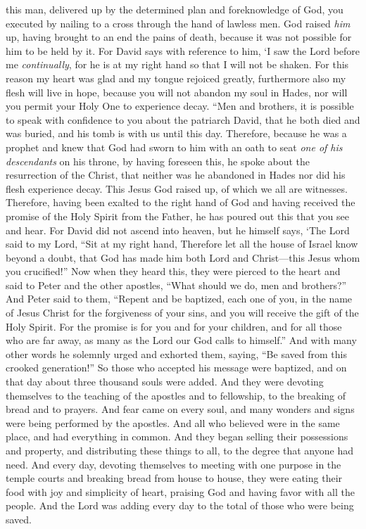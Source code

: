 \begin{biblechapter}
\verse this man, delivered up by the determined plan and foreknowledge of God, you executed by nailing to a cross through the hand of lawless men.
\verse God raised \textit{him} up, having brought to an end the pains of death, because it was not possible for him to be held by it.
\verse For David says with reference to him,
\verse ‘I saw the Lord before me \textit{continually}, 
for he is at my right hand so that I will not be shaken.
\verse For this reason my heart was glad 
and my tongue rejoiced greatly, 
furthermore also my flesh will live in hope,
\verse because you will not abandon my soul in Hades, 
nor will you permit your Holy One to experience decay.
\verse “Men and brothers, it is possible to speak with confidence to you about the patriarch David, that he both died and was buried, and his tomb is with us until this day.
\verse Therefore, because he was a prophet and knew that God had sworn to him with an oath to seat \textit{one of his descendants} on his throne,
\verse by having foreseen this, he spoke about the resurrection of the Christ, that neither was he abandoned in Hades nor did his flesh experience decay.
\verse This Jesus God raised up, of which we all are witnesses.
\verse Therefore, having been exalted to the right hand of God and having received the promise of the Holy Spirit from the Father, he has poured out this that you see and hear.
\verse For David did not ascend into heaven, but he himself says,
\verse ‘The Lord said to my Lord, 
“Sit at my right hand,
\verse Therefore let all the house of Israel know beyond a doubt, that God has made him both Lord and Christ—this Jesus whom you crucified!”
 Now when they heard this, they were pierced to the heart and said to Peter and the other apostles, “What should we do, men and brothers?”
\verse And Peter said to them, “Repent and be baptized, each one of you, in the name of Jesus Christ for the forgiveness of your sins, and you will receive the gift of the Holy Spirit.
\verse For the promise is for you and for your children, and for all those who are far away, as many as the Lord our God calls to himself.”
\verse And with many other words he solemnly urged and exhorted them, saying, “Be saved from this crooked generation!”
\verse So those who accepted his message were baptized, and on that day about three thousand souls were added.
 And they were devoting themselves to the teaching of the apostles and to fellowship, to the breaking of bread and to prayers.
\verse And fear came on every soul, and many wonders and signs were being performed by the apostles.
\verse And all who believed were in the same place, and had everything in common.
\verse And they began selling their possessions and property, and distributing these things to all, to the degree that anyone had need.
\verse And every day, devoting themselves to meeting with one purpose in the temple courts and breaking bread from house to house, they were eating their food with joy and simplicity of heart,
\verse praising God and having favor with all the people. And the Lord was adding every day to the total of those who were being saved.
\end{biblechapter}


